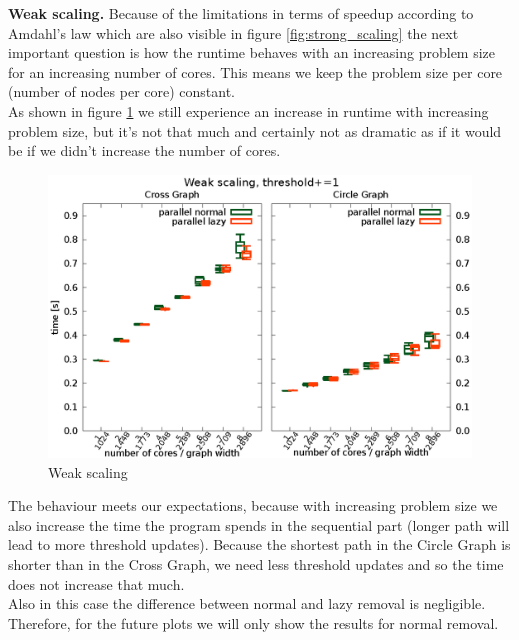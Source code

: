 \documentclass[letterpaper]{article}
\newcommand{\mypar}[1]{{\bf #1.}}
\begin{document}
\mypar{Weak scaling}
Because of the limitations in terms of speedup according to Amdahl's law which are also visible in figure \ref{fig:strong_scaling} the next important question is how the runtime behaves with an increasing problem size for an increasing number of cores. This means we keep the problem size per core (number of nodes per core) constant.\\
As shown in figure \ref{fig:weak_scaling} we still experience an increase in runtime with increasing problem size, but it's not that much and certainly not as dramatic as if it would be if we didn't increase the number of cores.
\begin{figure}[h]\centering
  \includegraphics[scale=0.558]{weak_scaling.eps}
  \caption{Weak scaling\label{fig:weak_scaling}}
\end{figure}
The behaviour meets our expectations, because with increasing problem size we also increase the time the program spends in the sequential part (longer path will lead to more threshold updates). Because the shortest path in the Circle Graph is shorter than in the Cross Graph, we need less threshold updates and so the time does not increase that much. \\
Also in this case the difference between normal and lazy removal is negligible. Therefore, for the future plots we will only show the results for normal removal.
\end{document}

